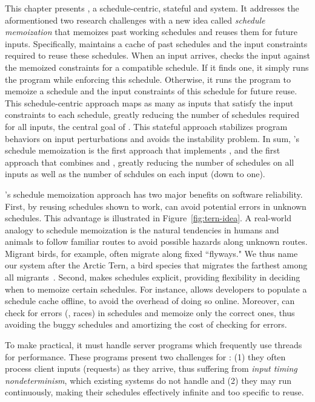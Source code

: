 This chapter presents \tern, a schedule-centric, stateful \smt and \dmt system. 
It addresses the aformentioned two research challenges with a new idea called
\emph{schedule memoization} that memoizes past working schedules and reuses them
for future inputs.  Specifically, \tern maintains a cache of past schedules and
the input constraints required to reuse these schedules.  When an input arrives,
\tern checks the input against the memoized constraints for a compatible
schedule.  If it finds one, it simply runs the program while enforcing
this schedule.  Otherwise, it runs the program to memoize a schedule and
the input constraints of this schedule for future reuse. This schedule-centric
approach maps as many as inputs that satisfy the input constraints to each
schedule, greatly reducing the number of schedules required for all inputs, the
central goal of \smt. This stateful approach stabilizes program behaviors
on input perturbations and avoids the instability problem. In sum, \tern's
schedule memoization is the first approach that implements \smt, and the first
approach that combines \smt and \dmt, greatly reducing the number of schedules
on all inputs as well as the number of schdules on each input (down to one).

\tern's schedule memoization approach has two major benefits on software
reliability. First, by reusing schedules shown to work, \tern can avoid
potential errors in unknown schedules.  This advantage is illustrated in
Figure~\ref{fig:tern-idea}. A real-world analogy to schedule memoization is the
natural tendencies in humans and animals to follow familiar routes to avoid
possible hazards along unknown routes.  Migrant birds, for example, often
migrate along fixed ``flyways."  We thus name our system after the Arctic Tern,
a bird species that migrates the farthest among all
migrants~\cite{artic-tern-wiki}. Second, \tern makes schedules explicit,
providing flexibility in deciding when to memoize certain schedules.  For
instance, \tern allows developers to populate a schedule cache offline, to avoid
the overhead of doing so online.  Moreover, \tern can check for errors (\eg,
races) in schedules and memoize only the correct ones, thus avoiding the buggy
schedules and amortizing the cost of checking for errors.

To make \tern practical, it must handle server programs which frequently
use threads for performance.  These programs present two challenges for
\tern: (1) they often process client inputs (requests) as they arrive, thus
suffering from \emph{input timing nondeterminism}, which existing \dmt systems
do not handle and (2) they may run continuously, making their schedules
effectively infinite and too specific to reuse.

